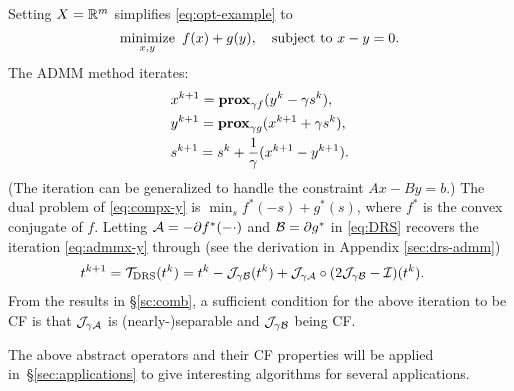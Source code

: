 {\DIFdelbegin %
\DIFdelend \DIFaddbegin \begin{example}[ADMM]\DIFaddend \label{alg:admm} Setting $X=\mathbb{R}^m$ simplifies \eqref{eq:opt-example} to
\begin{equation}\label{eq:compx-y}
\Min_{x,y}~f(x)+g(y),\quad\St~ x-y=0.
\end{equation}
The ADMM method iterates:
\begin{subequations}\label{eq:admmx-y}
\begin{align}
&x^{k+1}=\prox_{\gamma f}(y^k-\gamma s^k),\\%
&y^{k+1}=\prox_{\gamma g}(x^{k+1}+\gamma s^{k}),\\%
&s^{k+1}=s^k+\frac{1}{\gamma}(x^{k+1}-y^{k+1}).
\end{align}
\end{subequations}
(The iteration can be generalized to handle the constraint $Ax-By=b$.) The dual problem of \eqref{eq:compx-y} is $\min_s f^*(-s)+g^*(s)$, where $f^*$ is the convex conjugate of $f$. Letting ${\mathcal{A}}=-\partial f^*(-\cdot)$ and ${\mathcal{B}}=\partial g^*$ in \eqref{eq:DRS} recovers the iteration  \eqref{eq:admmx-y} through (see the derivation in Appendix \ref{sec:drs-admm})
\begin{align*}
&t^{k+1}=\TDRS(t^k)=t^k-\cJ_{\gamma \cB}(t^k)+\cJ_{\gamma\cA}\circ(2\cJ_{\gamma \cB}-\cI)(t^k).
\end{align*}  %
From the results in \S\ref{sc:comb}, a sufficient condition for the above iteration to be CF is that ${\mathcal{J}}_{\gamma{\mathcal{A}}}$ is (nearly-)separable and ${\mathcal{J}}_{\gamma{\mathcal{B}}}$ being CF.
\end{example}

The above abstract operators and their CF properties will be applied in~\S\ref{sec:applications} to give interesting algorithms for several applications.


}
